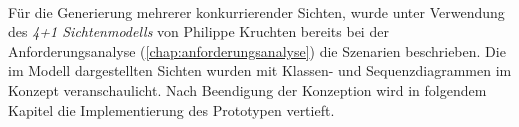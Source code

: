\\
\linebreak
Für die Generierung mehrerer konkurrierender Sichten, wurde unter Verwendung des \textit{4+1 Sichtenmodells} von Philippe Kruchten \cite{Kruchten1995}
bereits bei der Anforderungsanalyse (\ref{chap:anforderungsanalyse}) die Szenarien beschrieben. Die im Modell dargestellten Sichten wurden mit 
Klassen- und Sequenzdiagrammen %
im Konzept veranschaulicht. Nach Beendigung der Konzeption wird in folgendem Kapitel die 
Implementierung des Prototypen vertieft. 
